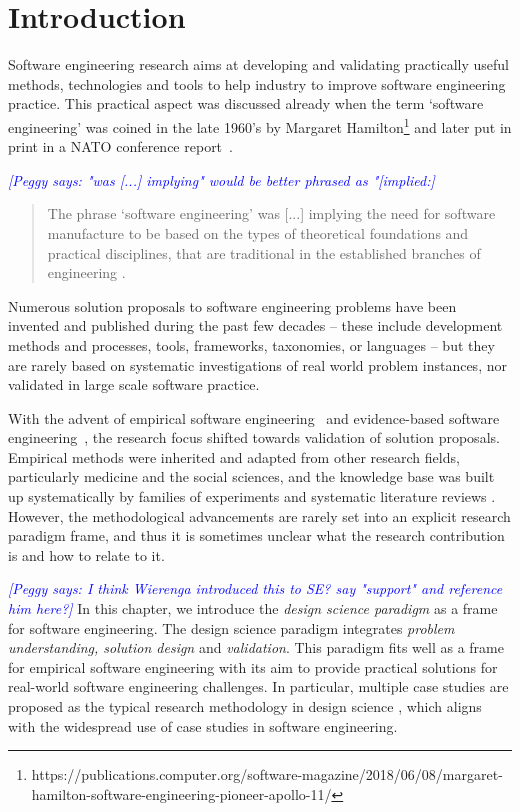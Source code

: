\documentclass[graybox]{svmult}
\newcommand{\peggy}[1]{\textcolor{blue}{{\it [Peggy says: #1]}}}
\newcommand{\peggy}[1]{}
\begin{document}
\section{Introduction}
\label{sec:intro}


Software engineering research aims at developing and validating practically useful methods, technologies and tools to help industry to improve software engineering practice. This practical aspect was discussed already when the term `software engineering' was coined in the late 1960's by Margaret Hamilton\footnote{https://publications.computer.org/software-magazine/2018/06/08/margaret-hamilton-software-engineering-pioneer-apollo-11/} and later put in print in a NATO conference report~\cite{Nato1968}. 

\peggy{"was [...] implying" would be better phrased as "[implied:}
\begin{quote}
{The phrase `software engineering' was [...] implying the need for software manufacture to be based on the types of theoretical foundations and practical disciplines, that are traditional in the established branches of engineering} \cite[p13]{Nato1968}. 
\end{quote}

Numerous solution proposals to software engineering problems have been invented and published during the past few decades -- these include development methods and processes, tools, frameworks, taxonomies, or languages -- but they are rarely based on systematic investigations of real world problem instances, nor validated in large scale software practice.

With the advent of empirical software engineering~\cite{Basili86} and evidence-based software engineering~\cite{Kitchenham04}, the research focus shifted towards validation of solution proposals. Empirical methods were inherited and adapted from other research fields, particularly medicine and the social sciences, and the knowledge base was built up systematically by families of experiments \cite{Basili99} and systematic literature reviews \cite{Kitchenham15}. However, the methodological advancements are rarely set into an explicit research paradigm frame, and thus it is sometimes unclear what the research contribution is and how to relate to it. 

\peggy{I think Wierenga introduced this to SE? say "support" and reference him here?}
In this chapter, we introduce the \emph{design science paradigm} as a frame for software engineering. The design science paradigm integrates \emph{problem understanding, solution design} and \emph{validation}. This paradigm fits well as a frame for empirical software engineering with its aim to provide practical solutions for real-world software engineering challenges. In particular, multiple case studies are proposed as the typical research methodology in design science \cite{van_aken_management_2004}, which aligns with the widespread use of case studies in software engineering.
\end{document}
